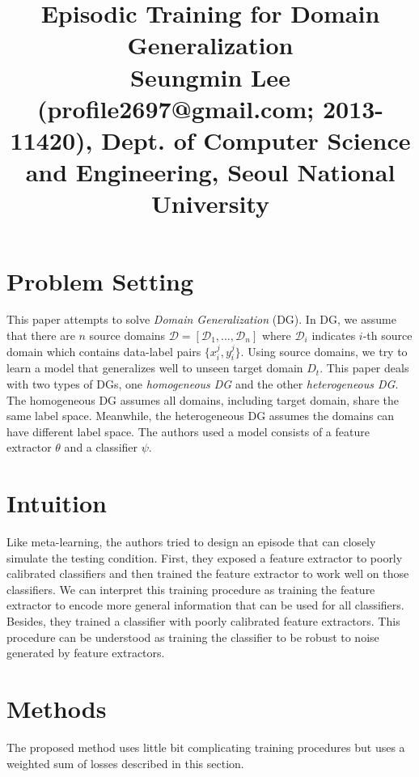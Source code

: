 \documentclass[10pt,twocolumn,letterpaper]{article}
\newcommand{\D}{\mathcal{D}}
\begin{document}
\title{Episodic Training for Domain Generalization
	 \\ {\rm {\normalsize Seungmin Lee (profile2697@gmail.com; 2013-11420), Dept. of Computer Science and Engineering, Seoul National University}}} 

\maketitle
\thispagestyle{empty}


\section{Problem Setting}
This paper attempts to solve \textit{Domain Generalization} (DG). In DG, we assume that there are $n$ source domains $\D = [\D_1,\dots, \D_n]$ where $\D_i$ indicates $i$-th source domain which contains data-label pairs $\{x_i^j, y_i^j\}$. Using source domains, we try to learn a model that generalizes well to unseen target domain $D_t$. This paper deals with two types of DGs, one \textit{homogeneous DG} and the other \textit{heterogeneous DG}. The homogeneous DG assumes all domains, including target domain, share the same label space. Meanwhile, the heterogeneous DG assumes the domains can have different label space.
The authors used a model consists of a feature extractor $\theta$ and a classifier $\psi$. 

\section{Intuition}
Like meta-learning, the authors tried to design an episode that can closely simulate the testing condition. First, they exposed a feature extractor to poorly calibrated classifiers and then trained the feature extractor to work well on those classifiers. We can interpret this training procedure as training the feature extractor to encode more general information that can be used for all classifiers. Besides, they trained a classifier with poorly calibrated feature extractors. This procedure can be understood as training the classifier to be robust to noise generated by feature extractors.

\section{Methods}
The proposed method uses little bit complicating training procedures but uses a weighted sum of losses described in this section.
\end{document}
